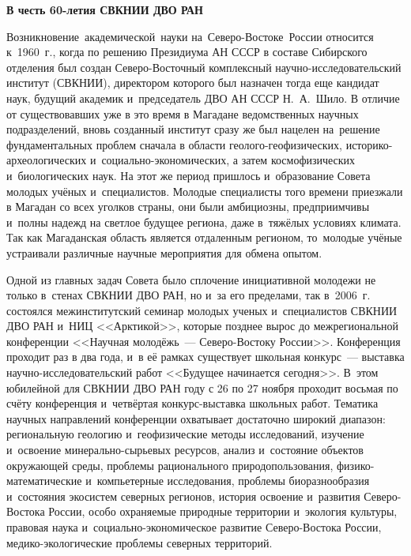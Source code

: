 \begin{center}
  \textbf{В честь 60-летия СВКНИИ ДВО РАН}
\end{center}

Возникновение\,\,\,академической\,\,\,науки\,\,на\,\,\,Северо-Востоке\,\,\,России относится к~1960~г., когда по решению Президиума АН СССР в составе Сибирского отделения был создан Северо-Восточный комплексный научно-исследовательский институт (СВКНИИ), директором которого был назначен тогда еще кандидат наук, будущий академик и~председатель ДВО АН СССР Н.~А.~Шило. В отличие от существовавших уже в это время в Магадане ведомственных научных подразделений, вновь созданный институт сразу же был нацелен на~решение фундаментальных проблем сначала в области геолого-геофизических, историко-археологических и~социально-экономических, а затем космофизических и~биологических наук. На этот же период пришлось и~образование Совета молодых учёных и~специалистов. Молодые специалисты того времени приезжали в Магадан со всех уголков страны, они были амбициозны, предприимчивы и~полны надежд на светлое будущее региона, даже в~тяжёлых условиях климата. Так как Магаданская область является отдаленным регионом, то~молодые учёные устраивали различные научные мероприятия для обмена опытом.

Одной из главных задач Совета было сплочение инициативной молодежи не только в~стенах СВКНИИ ДВО РАН, но и~за его пределами, так в~2006~г. состоялся межинститутский семинар молодых ученых и~специалистов СВКНИИ ДВО РАН и~НИЦ <<Арктикой>>, которые позднее вырос до межрегиональной конференции <<Научная молодёжь~--- Северо-Востоку России>>. Конференция проходит раз в два года, и~в её рамках существует школьная конкурс~--- выставка научно-исследовательский работ <<Будущее начинается сегодня>>. В~этом юбилейной для СВКНИИ ДВО РАН году с 26 по 27 ноября проходит восьмая по счёту конференция и~четвёртая конкурс-выставка школьных работ. Тематика научных направлений конференции охватывает достаточно широкий диапазон: региональную геологию и~геофизические методы исследований, изучение и~освоение минерально-сырьевых ресурсов, анализ и~состояние объектов окружающей среды, проблемы рационального природопользования, физико-математические и~компьетерные исследования, проблемы биоразнообразия и~состояния экосистем северных регионов, история освоение и~развития Северо-Востока России, особо охраняемые природные территории и~экология культуры, правовая наука и~социально-экономическое развитие Северо-Востока России, медико-экологические проблемы северных территорий.

